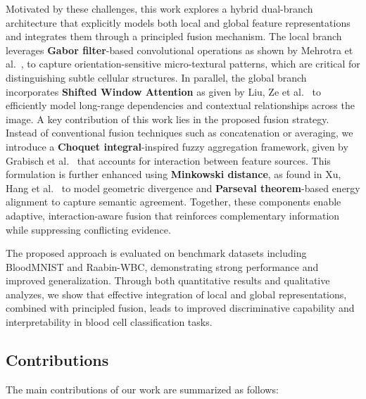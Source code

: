 \documentclass[preprint,12pt]{elsarticle}
\begin{document}
Motivated by these challenges, this work explores a hybrid dual-branch architecture that explicitly models both local and global feature representations and integrates them through a principled fusion mechanism. The local branch leverages \textbf{Gabor filter}-based convolutional operations as shown by Mehrotra et al.~\cite{b33}, to capture orientation-sensitive micro-textural patterns, which are critical for distinguishing subtle cellular structures. In parallel, the global branch incorporates \textbf{Shifted Window Attention} as given by Liu, Ze et al.~\cite{b34} to efficiently model long-range dependencies and contextual relationships across the image. A key contribution of this work lies in the proposed fusion strategy. Instead of conventional fusion techniques such as concatenation or averaging, we introduce a \textbf{Choquet integral}-inspired fuzzy aggregation framework, given by Grabisch et al.~\cite{b35} that accounts for interaction between feature sources. This formulation is further enhanced using \textbf{Minkowski distance}, as found in Xu, Hang et al.~\cite{b36} to model geometric divergence and \textbf{Parseval theorem}-based energy alignment to capture semantic agreement. Together, these components enable adaptive, interaction-aware fusion that reinforces complementary information while suppressing conflicting evidence.

The proposed approach is evaluated on benchmark datasets including BloodMNIST and Raabin-WBC, demonstrating strong performance and improved generalization. Through both quantitative results and qualitative analyzes, we show that effective integration of local and global representations, combined with principled fusion, leads to improved discriminative capability and interpretability in blood cell classification tasks.
\subsection{Contributions}

The main contributions of our work are summarized as follows:
\end{document}
